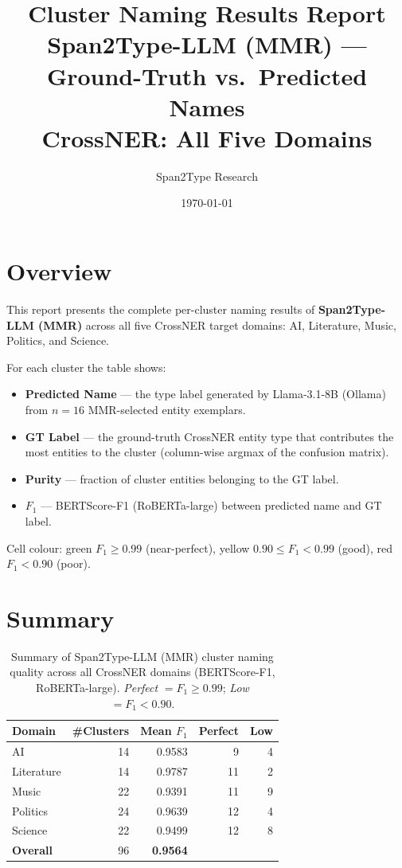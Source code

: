 \documentclass[11pt,a4paper]{article}
\title{\textbf{Cluster Naming Results Report}\\[0.4em]
\large Span2Type-LLM (MMR) --- Ground-Truth vs.\ Predicted Names\\
CrossNER: All Five Domains}
\author{Span2Type Research}
\date{\today}
\begin{document}
\maketitle
\tableofcontents
\newpage

\section{Overview}

This report presents the complete per-cluster naming results of \textbf{Span2Type-LLM (MMR)}
across all five CrossNER target domains: AI, Literature, Music, Politics, and Science.

For each cluster the table shows:
\begin{itemize}
  \item \textbf{Predicted Name} --- the type label generated by Llama-3.1-8B (Ollama)
        from $n{=}16$ MMR-selected entity exemplars.
  \item \textbf{GT Label} --- the ground-truth CrossNER entity type that contributes
        the most entities to the cluster (column-wise argmax of the confusion matrix).
  \item \textbf{Purity} --- fraction of cluster entities belonging to the GT label.
  \item \textbf{$F_1$} --- BERTScore-F1 (RoBERTa-large) between predicted name and GT label.
\end{itemize}

Cell colour: \colorbox{green!15}{green} $F_1 \geq 0.99$ (near-perfect),
\colorbox{yellow!25}{yellow} $0.90 \leq F_1 < 0.99$ (good),
\colorbox{red!15}{red} $F_1 < 0.90$ (poor).

\section{Summary}

\begin{table}[ht]
\centering
\caption{Summary of Span2Type-LLM (MMR) cluster naming quality across all CrossNER domains
(BERTScore-F1, RoBERTa-large). \textit{Perfect} $= F_1 \geq 0.99$; \textit{Low} $= F_1 < 0.90$.}
\label{tab:naming_summary}
\begin{tabular}{lrrrr}
\toprule
\textbf{Domain} & \textbf{\#Clusters} & \textbf{Mean $F_1$} & \textbf{Perfect} & \textbf{Low} \\
\midrule
  AI           & 14 & 0.9583 & 9 & 4 \\
  Literature   & 14 & 0.9787 & 11 & 2 \\
  Music        & 22 & 0.9391 & 11 & 9 \\
  Politics     & 24 & 0.9639 & 12 & 4 \\
  Science      & 22 & 0.9499 & 12 & 8 \\
\midrule
  \textbf{Overall} & 96 & \textbf{0.9564} & & \\
\bottomrule
\end{tabular}
\end{table}
\end{document}
